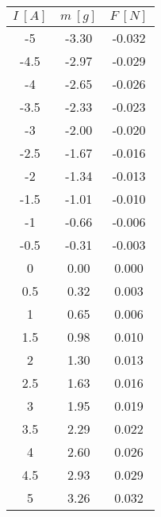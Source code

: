 \documentclass[11pt]{article}
\begin{document}
    \begin{minipage}{.6\textwidth}
        \begin{table}[H]
            \centering
            \begin{tabular}{|c|c|c|}
                \hline
                \rowcolor{gray} $I \ [A]$ & $m \ [g]$ & $F \ [N]$ \\
                \hline
                -5 & -3.30 & -0.032 \\
                \hline
                -4.5 & -2.97 & -0.029 \\
                \hline
                -4 & -2.65 & -0.026 \\
                \hline
                -3.5 & -2.33 & -0.023 \\
                \hline
                -3 & -2.00 & -0.020 \\
                \hline
                -2.5 & -1.67 & -0.016 \\
                \hline
                -2 & -1.34 & -0.013 \\
                \hline
                -1.5 & -1.01 & -0.010 \\
                \hline
                -1 & -0.66 & -0.006 \\
                \hline
                -0.5 & -0.31 & -0.003 \\
                \hline
                0 & 0.00 & 0.000 \\
                \hline
                0.5 & 0.32 & 0.003 \\
                \hline
                1 & 0.65 & 0.006 \\
                \hline
                1.5 & 0.98 & 0.010 \\
                \hline
                2 & 1.30 & 0.013 \\
                \hline
                2.5 & 1.63 & 0.016 \\
                \hline
                3 & 1.95 & 0.019 \\
                \hline
                3.5 & 2.29 & 0.022 \\
                \hline
                4 & 2.60 & 0.026 \\
                \hline
                4.5 & 2.93 & 0.029 \\
                \hline
                5 & 3.26 & 0.032 \\
                \hline
            \end{tabular}
            \hspace{1cm}

\end{table}
\end{minipage}
\end{document}
